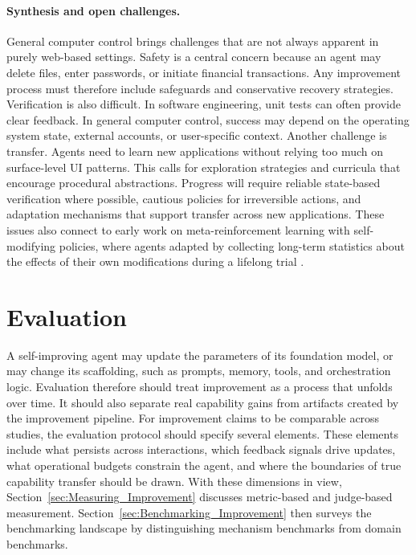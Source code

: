 \documentclass{article}
\begin{document}
\paragraph{Synthesis and open challenges.}
General computer control brings challenges that are not always apparent in purely web-based settings. Safety is a central concern because an agent may delete files, enter passwords, or initiate financial transactions. Any improvement process must therefore include safeguards and conservative recovery strategies. Verification is also difficult. In software engineering, unit tests can often provide clear feedback. In general computer control, success may depend on the operating system state, external accounts, or user-specific context. Another challenge is transfer. Agents need to learn new applications without relying too much on surface-level UI patterns. This calls for exploration strategies and curricula that encourage procedural abstractions. Progress will require reliable state-based verification where possible, cautious policies for irreversible actions, and adaptation mechanisms that support transfer across new applications. These issues also connect to early work on meta-reinforcement learning with self-modifying policies, where agents adapted by collecting long-term statistics about the effects of their own modifications during a lifelong trial \citep{Schmidhuber1994OnLH, schmidhuber1997shifting, schmidhuber1998reinforcement, schmidhuber1999general, schmidhuber2006goedelmachinesselfreferentialuniversal}.



\section{Evaluation}
\label{sec:Evaluation} 


A self-improving agent may update the parameters of its foundation model, or  may change its scaffolding, such as prompts, memory, tools, and orchestration logic. Evaluation  therefore should treat improvement as a process that unfolds over time. It should also separate real capability gains from artifacts created by the improvement pipeline. For improvement claims to be comparable across studies, the evaluation protocol should specify several elements. These elements include what persists across interactions, which feedback signals drive updates, what operational budgets constrain the agent, and where the boundaries of true capability transfer should be drawn. With these dimensions in view, Section~\ref{sec:Measuring_Improvement} discusses metric-based and judge-based measurement. Section~\ref{sec:Benchmarking_Improvement} then surveys the benchmarking landscape by distinguishing mechanism benchmarks from domain benchmarks.
\end{document}
